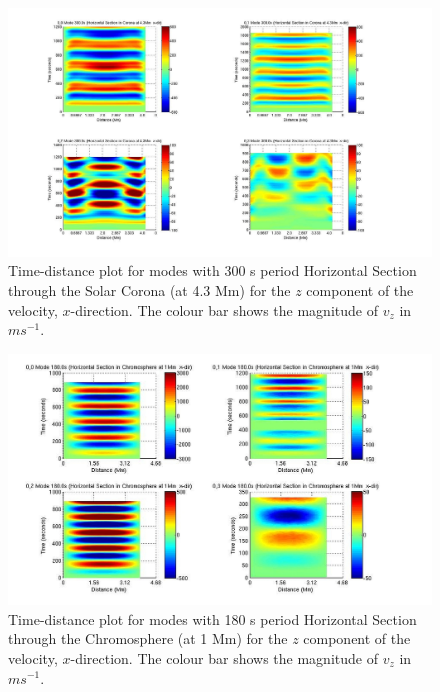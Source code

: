 \documentclass[preprint,authoryear,12pt]{elsarticle}
\begin{document}
\begin{figure}[h]
\includegraphics[scale=0.9]{imrescale/dt_300_hor_x_4p3Mm.jpg}
\caption{Time-distance plot for modes with 300 s period Horizontal Section through the Solar Corona (at 4.3 Mm) for the $z$ component of the velocity, $x$-direction. The colour bar shows the magnitude of $v_z$ in $ms^{-1}$.}
\end{figure}


\begin{figure}[h]
\includegraphics[scale=0.9]{imrescale/dt_180_horiz_x_1Mm.jpg}
\caption{Time-distance plot for modes with 180 s period Horizontal Section through the Chromosphere (at 1 Mm) for the $z$ component of the velocity, $x$-direction. The colour bar shows the magnitude of $v_z$ in $ms^{-1}$.}
\label{Fig14}
\end{figure}
\end{document}
